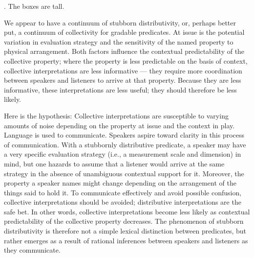 \documentclass[linguex]{sp}
\begin{document}
\ex. The boxes are tall.

%

We appear to have a continuum of stubborn distributivity, or, perhaps better put, a continuum of collectivity for gradable predicates. At issue is the potential variation in evaluation strategy and the sensitivity of the named property to physical arrangement. Both factors influence the contextual predictability of the collective property; where the property is less predictable on the basis of context, collective interpretations are less informative --- they require more coordination between speakers and listeners to arrive at that property. Because they are less informative, these interpretations are less useful; they should therefore be less likely.

Here is the hypothesis: Collective interpretations are susceptible to varying amounts of noise depending on the property at issue and the context in play. Language is used to communicate. Speakers aspire toward clarity in this process of communication. With a stubbornly distributive predicate, a speaker may have a very specific evaluation strategy (i.e., a measurement scale and dimension) in mind, but one hazards to assume that a listener would arrive at the same strategy in the absence of unambiguous contextual support for it. Moreover, the property a speaker names might change depending on the arrangement of the things said to hold it. To communicate effectively and avoid possible confusion, collective interpretations should be avoided; distributive interpretations are the safe bet. In other words, collective interpretations become less likely as contextual predictability of the collective property decreases. The phenomenon of stubborn distributivity is therefore not a simple lexical distinction between predicates, but rather emerges as a result of rational inferences between speakers and listeners as they communicate.
\end{document}
